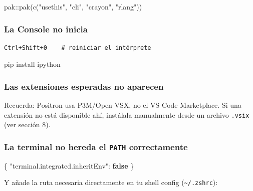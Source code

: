 \documentclass[
  doc,
  floatsintext,
  longtable,
  a4paper,
  nolmodern,
  notxfonts,
  notimes,
  12pt,
  colorlinks=true,linkcolor=blue,citecolor=blue,urlcolor=blue]{apa7}
\newenvironment{Shaded}{\begin{snugshade}}{\end{snugshade}}
\newcommand{\DataTypeTok}[1]{\textcolor[rgb]{0.68,0.00,0.00}{#1}}
\newcommand{\ExtensionTok}[1]{\textcolor[rgb]{0.00,0.23,0.31}{#1}}
\newcommand{\FunctionTok}[1]{\textcolor[rgb]{0.28,0.35,0.67}{#1}}
\newcommand{\KeywordTok}[1]{\textcolor[rgb]{0.00,0.23,0.31}{\textbf{#1}}}
\newcommand{\NormalTok}[1]{\textcolor[rgb]{0.00,0.23,0.31}{#1}}
\newcommand{\SpecialCharTok}[1]{\textcolor[rgb]{0.37,0.37,0.37}{#1}}
\newcommand{\StringTok}[1]{\textcolor[rgb]{0.13,0.47,0.30}{#1}}
\begin{document}
\begin{Shaded}
\begin{Highlighting}[]
\NormalTok{pak}\SpecialCharTok{::}\FunctionTok{pak}\NormalTok{(}\FunctionTok{c}\NormalTok{(}\StringTok{"usethis"}\NormalTok{, }\StringTok{"cli"}\NormalTok{, }\StringTok{"crayon"}\NormalTok{, }\StringTok{"rlang"}\NormalTok{))}
\end{Highlighting}
\end{Shaded}

\subsubsection{La Console no inicia}\label{la-console-no-inicia}

\begin{verbatim}
Ctrl+Shift+0    # reiniciar el intérprete
\end{verbatim}

\begin{Shaded}
\begin{Highlighting}[]
\ExtensionTok{pip}\NormalTok{ install ipython}
\end{Highlighting}
\end{Shaded}

\subsubsection{Las extensiones esperadas no
aparecen}\label{las-extensiones-esperadas-no-aparecen}

Recuerda: Positron usa P3M/Open VSX, no el VS Code Marketplace. Si una
extensión no está disponible ahí, instálala manualmente desde un archivo
\texttt{.vsix} (ver sección 8).

\subsubsection{\texorpdfstring{La terminal no hereda el \texttt{PATH}
correctamente}{La terminal no hereda el PATH correctamente}}\label{la-terminal-no-hereda-el-path-correctamente}

\begin{Shaded}
\begin{Highlighting}[]
\FunctionTok{\{}
  \DataTypeTok{"terminal.integrated.inheritEnv"}\FunctionTok{:} \KeywordTok{false}
\FunctionTok{\}}
\end{Highlighting}
\end{Shaded}

Y añade la ruta necesaria directamente en tu shell config
(\texttt{\textasciitilde{}/.zshrc}):
\end{document}
